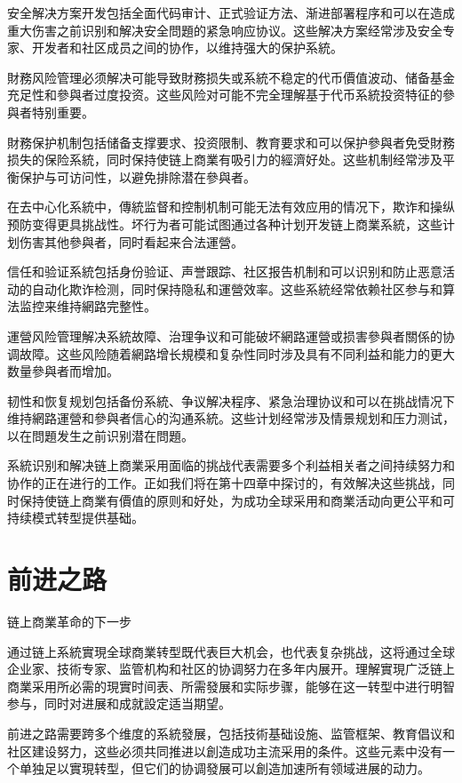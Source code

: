 \documentclass[
  Letterpaper,
]{scrbook}
\begin{document}
安全解决方案开发包括全面代码审计、正式验证方法、渐进部署程序和可以在造成重大伤害之前识别和解决安全問題的紧急响应协议。这些解决方案经常涉及安全专家、开发者和社区成员之间的协作，以维持强大的保护系統。

財務风险管理必须解决可能导致財務损失或系統不稳定的代币價值波动、储备基金充足性和參與者过度投资。这些风险对可能不完全理解基于代币系統投资特征的參與者特别重要。

財務保护机制包括储备支撑要求、投资限制、教育要求和可以保护參與者免受財務损失的保险系統，同时保持使链上商業有吸引力的經濟好处。这些机制经常涉及平衡保护与可访问性，以避免排除潜在參與者。

在去中心化系統中，傳統监督和控制机制可能无法有效应用的情况下，欺诈和操纵预防变得更具挑战性。坏行为者可能试图通过各种计划开发链上商業系統，这些计划伤害其他參與者，同时看起来合法運營。

信任和验证系統包括身份验证、声誉跟踪、社区报告机制和可以识别和防止恶意活动的自动化欺诈检测，同时保持隐私和運營效率。这些系統经常依赖社区参与和算法监控来维持網路完整性。

運營风险管理解决系統故障、治理争议和可能破坏網路運營或损害參與者關係的协调故障。这些风险随着網路增长規模和复杂性同时涉及具有不同利益和能力的更大数量參與者而增加。

韧性和恢复规划包括备份系統、争议解决程序、紧急治理协议和可以在挑战情况下维持網路運營和參與者信心的沟通系統。这些计划经常涉及情景规划和压力测试，以在問題发生之前识别潜在問題。

系統识别和解决链上商業采用面临的挑战代表需要多个利益相关者之间持续努力和协作的正在进行的工作。正如我们将在第十四章中探讨的，有效解决这些挑战，同时保持使链上商業有價值的原则和好处，为成功全球采用和商業活动向更公平和可持续模式转型提供基础。

\chapter{前进之路}\label{sec-path-forward}

链上商業革命的下一步

通过链上系統實現全球商業转型既代表巨大机会，也代表复杂挑战，这将通过全球企业家、技術专家、监管机构和社区的协调努力在多年内展开。理解實現广泛链上商業采用所必需的現實时间表、所需發展和实际步骤，能够在这一转型中进行明智参与，同时对进展和成就設定适当期望。

前进之路需要跨多个维度的系統發展，包括技術基础设施、监管框架、教育倡议和社区建设努力，这些必须共同推进以創造成功主流采用的条件。这些元素中没有一个单独足以實現转型，但它们的协调發展可以創造加速所有领域进展的动力。
\end{document}
